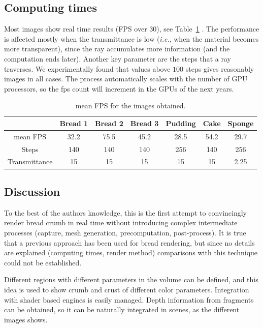 \documentclass[oneside,a4paper,english,links]{amca}
\begin{document}
\subsection{Computing times}
Most images show real time results (FPS over 30), see Table~\ref{tab:n1} . The performance is affected mostly when the transmittance is low ({\em i.e.}, when the material becomes more transparent), since the ray accumulates more information (and the computation ends later). Another key parameter are the steps that a ray traverses. We experimentally found that values above $100$ steps gives reasonably images in all cases. The process automatically scales with the number of GPU processors, so the fps count will increment in the GPUs of the next years.

\begin{table}[htb]
\centering
\begin{tabular}{|c|c|c|c|c|c|c|}
\hline &  Bread 1 & Bread 2 & Bread 3 & Pudding & Cake & Sponge \\
\hline
\hline
 mean FPS  & 32.2 &  75.5 &  45.2 & 28.5 &  54.2 & 29.7\\
\hline
 Steps &  140 &  140 &  140 & 256 &  140 & 256 \\
\hline
 Transmittance &  15 &  15 &  15 & 15 &  15 & 2.25 \\
\hline
\end{tabular}
\caption{mean FPS for the images obtained. }
\label{tab:n1}
\end{table}

\subsection{Discussion}
To the best of the authors knowledge, this is the first attempt to convincingly render bread crumb in real time without introducing complex intermediate processes (capture, mesh generation, precomputation, post-process). It is true that a previous approach \citep{Cho2007} has been used for bread rendering, but since no details are explained (computing times, render method) comparisons with this technique could not be established.

Different regions with different parameters in the volume can be
defined, and this idea is used to show crumb and crust of different
color parameters. 
Integration with shader based engines is easily managed. Depth
information from fragments can be obtained, so it can be naturally
integrated in scenes, as the different images shows.
\end{document}
